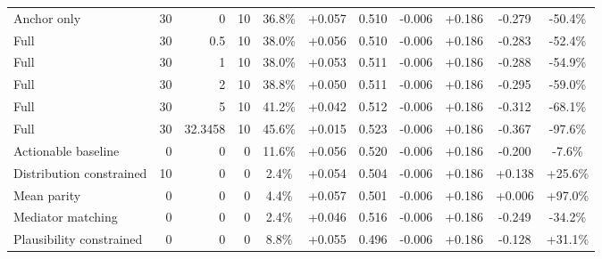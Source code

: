 \begin{table}[htbp]
\begin{tabular}{lrrrccccccc}
Anchor only & 30 & 0 & 10 & 36.8\% & +0.057 & 0.510 & -0.006 & +0.186 & -0.279 & -50.4\% \\
Full & 30 & 0.5 & 10 & 38.0\% & +0.056 & 0.510 & -0.006 & +0.186 & -0.283 & -52.4\% \\
Full & 30 & 1 & 10 & 38.0\% & +0.053 & 0.511 & -0.006 & +0.186 & -0.288 & -54.9\% \\
Full & 30 & 2 & 10 & 38.8\% & +0.050 & 0.511 & -0.006 & +0.186 & -0.295 & -59.0\% \\
Full & 30 & 5 & 10 & 41.2\% & +0.042 & 0.512 & -0.006 & +0.186 & -0.312 & -68.1\% \\
Full & 30 & 32.3458 & 10 & 45.6\% & +0.015 & 0.523 & -0.006 & +0.186 & -0.367 & -97.6\% \\
Actionable baseline & 0 & 0 & 0 & 11.6\% & +0.056 & 0.520 & -0.006 & +0.186 & -0.200 & -7.6\% \\
Distribution constrained & 10 & 0 & 0 & 2.4\% & +0.054 & 0.504 & -0.006 & +0.186 & +0.138 & +25.6\% \\
Mean parity & 0 & 0 & 0 & 4.4\% & +0.057 & 0.501 & -0.006 & +0.186 & +0.006 & +97.0\% \\
Mediator matching & 0 & 0 & 0 & 2.4\% & +0.046 & 0.516 & -0.006 & +0.186 & -0.249 & -34.2\% \\
Plausibility constrained & 0 & 0 & 0 & 8.8\% & +0.055 & 0.496 & -0.006 & +0.186 & -0.128 & +31.1\% \\
\bottomrule
\end{tabular}
\end{table}